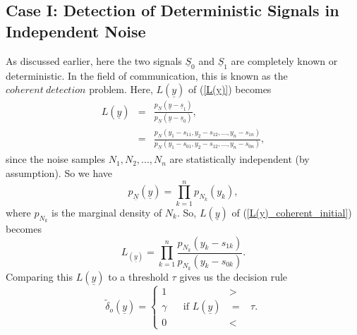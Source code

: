 \documentclass[a4paper,english,12pt]{article}
\begin{document}
\subsection{Case I: Detection of Deterministic Signals in Independent Noise}
As discussed earlier, here the two signals $\underline{S}_{0}$ and $\underline{S}_{1}$ are completely known or deterministic. In the field of communication, this is known as the $coherent\ detection$ problem. Here, $L(\underline{y})$ of (\ref{L(y)}) becomes
\begin{eqnarray}
\label{L(y)_coherent_initial}
L (\underline{y})&=&\frac{p_{\underline{N}}(\underline{y}-\underline{s}_{1})}{p_{\underline{N}}(\underline{y}-\underline{s}_{0})},\nonumber\\
&=&\frac{p_{\underline{N}}(y_{1}-s_{11},y_{2}-s_{12},...,y_{n}-s_{1n})} {p_{\underline{N}}(y_{1}-s_{01},y_{2}-s_{12},...,y_{n}-s_{0n})},
\end{eqnarray}
since the noise samples $N_{1},N_{2},...,N_{n}$ are statistically independent (by assumption). So we have
\begin{equation}
p_{\underline{N}}(\underline{y})= \prod_{k=1}^{n}   p_{N_{k}}(y_{k}),
\end{equation}
where $p_{N_{k}}$ is the marginal density of $N_{k}$. So, $L({\underline{y}})$ of (\ref{L(y)_coherent_initial}) becomes  
\begin{equation}
\label{L(y)_Coherent}
L_(\underline{y})= \prod_{k=1}^{n}\frac{p_{N_{k}}(y_{k}-s_{1k})}{p_{N_{k}}(y_{k}-s_{0k})}.
\end{equation}
Comparing this $L(\underline{y})$ to a threshold $\tau$ gives us the decision rule
\begin{equation}
\tilde\delta_{o}(\underline{y})=\begin{cases} 
1 &>\\
\gamma \hspace{20pt}\text{if } L(\underline{y}) &= \hspace{10pt}\tau.\\
0 &<
\end{cases}
\end{equation}
\end{document}
